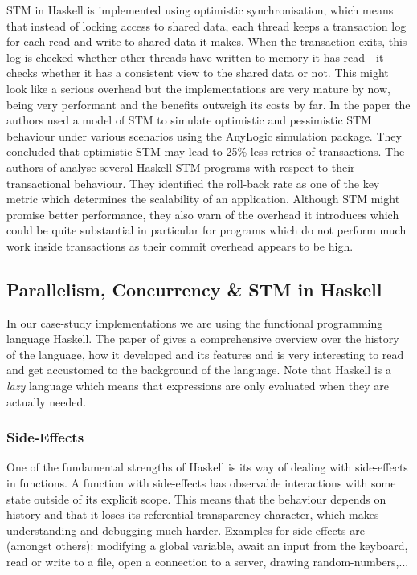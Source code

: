 STM in Haskell is implemented using optimistic synchronisation, which means that instead of locking access to shared data, each thread keeps a transaction log for each read and write to shared data it makes. When the transaction exits, this log is checked whether other threads have written to memory it has read - it checks whether it has a consistent view to the shared data or not. This might look like a serious overhead but the implementations are very mature by now, being very performant and the benefits outweigh its costs by far. In the paper \cite{heindl_modeling_2009} the authors used a model of STM to simulate optimistic and pessimistic STM behaviour under various scenarios using the AnyLogic simulation package. They concluded that optimistic STM may lead to 25\% less retries of transactions. The authors of \cite{perfumo_limits_2008} analyse several Haskell STM programs with respect to their transactional behaviour. They identified the roll-back rate as one of the key metric which determines the scalability of an application. Although STM might promise better performance, they also warn of the overhead it introduces which could be quite substantial in particular for programs which do not perform much work inside transactions as their commit overhead appears to be high.

\subsection{Parallelism, Concurrency \& STM in Haskell}
In our case-study implementations we are using the functional programming language Haskell. The paper of \citep{hudak_history_2007} gives a comprehensive overview over the history of the language, how it developed and its features and is very interesting to read and get accustomed to the background of the language. Note that Haskell is a \textit{lazy} language which means that expressions are only evaluated when they are actually needed.

\subsubsection{Side-Effects}
One of the fundamental strengths of Haskell is its way of dealing with side-effects in functions. A function with side-effects has observable interactions with some state outside of its explicit scope. This means that the behaviour depends on history and that it loses its referential transparency character, which makes understanding and debugging much harder. Examples for side-effects are (amongst others): modifying a global variable, await an input from the keyboard, read or write to a file, open a connection to a server, drawing random-numbers,...

